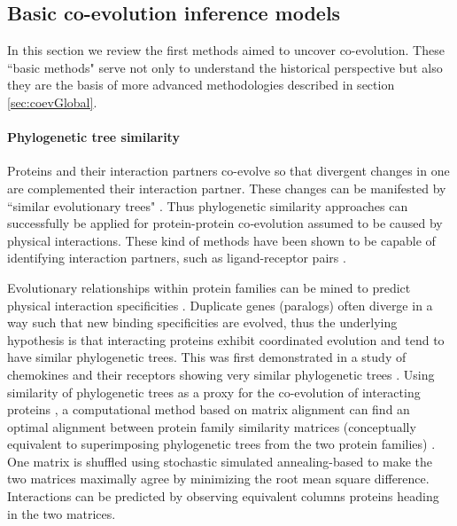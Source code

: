 \subsection{Basic co-evolution inference models}

In this section we review the first methods aimed to uncover co-evolution.
These ``basic methods" serve not only to understand the historical perspective but also they are the basis of more advanced methodologies described in section \ref{sec:coevGlobal}.

\paragraph{Phylogenetic tree similarity}
Proteins and their interaction partners co-evolve so that divergent changes in one are complemented their interaction partner. 
These changes can be manifested by ``similar evolutionary trees" \cite{goh2000co}.
Thus phylogenetic similarity approaches can successfully be applied for protein-protein co‐evolution assumed to be caused by physical interactions.
These kind of methods have been shown to be capable of identifying interaction partners, such as ligand-receptor pairs \cite{de2013emerging}.

Evolutionary relationships within protein families can be mined to predict physical interaction specificities \cite{ramani2003exploiting}.
Duplicate genes (paralogs) often diverge in a way such that new binding specificities are evolved, thus the underlying hypothesis is that interacting proteins exhibit coordinated evolution and tend to have similar phylogenetic trees.
This was first demonstrated in a study of chemokines and their receptors showing very similar phylogenetic trees \cite{goh2000co}.
Using similarity of phylogenetic trees as a proxy for the co-evolution of interacting proteins \cite{ramani2003exploiting}, a computational method based on matrix alignment can find an optimal alignment between protein family similarity matrices (conceptually equivalent to superimposing  phylogenetic trees from the two protein families) \cite{ramani2003exploiting}.
One matrix is shuffled using stochastic simulated annealing-based to make the two matrices maximally agree by minimizing the root mean square difference.
Interactions can be predicted by observing equivalent columns proteins heading in the two matrices.  \cite{ramani2003exploiting}

